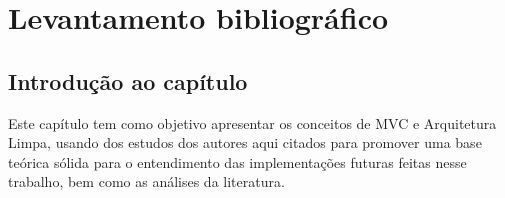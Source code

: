 \chapter{Levantamento bibliográfico}
    \section{Introdução ao capítulo}
        \par Este capítulo tem como objetivo apresentar os conceitos de MVC e Arquitetura Limpa, usando dos estudos dos autores aqui citados para promover uma base teórica sólida para o entendimento das implementações futuras feitas nesse trabalho, bem como as análises da literatura.
    
    
    